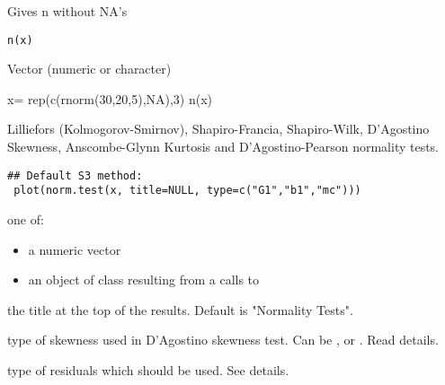 \documentclass[a4paper]{book}
\begin{document}
\newpage
{}
%
\begin{Description}\relax
Gives n without NA's
\end{Description}
%
\begin{Usage}
\begin{verbatim}
n(x)
\end{verbatim}
\end{Usage}
%
\begin{Arguments}
\begin{ldescription}
\item[\code{x}] 
Vector (numeric or character)

\end{ldescription}
\end{Arguments}
%
\begin{Examples}
\begin{ExampleCode}
x= rep(c(rnorm(30,20,5),NA),3)
n(x)
\end{ExampleCode}
\end{Examples}
\newpage
{}
%
\begin{Description}\relax
Lilliefors (Kolmogorov-Smirnov), Shapiro-Francia, Shapiro-Wilk, 
D'Agostino Skewness, Anscombe-Glynn Kurtosis and D'Agostino-Pearson normality tests.
\end{Description}
%
\begin{Usage}
\begin{verbatim}
## Default S3 method:
 plot(norm.test(x, title=NULL, type=c("G1","b1","mc")))
\end{verbatim}
\end{Usage}
%
\begin{Arguments}
\begin{ldescription}
\item[\code{x}] one of:
\begin{itemize}

\item a numeric vector
\item an object of class  resulting from a
calls to 

\end{itemize}


\item[\code{title }] the title at the top of the results. Default is "Normality Tests".
\item[\code{sk }] type of skewness used in D'Agostino skewness test. Can be , or . Read details.
\item[\code{type }] type of residuals which should be used. See details.
\end{ldescription}
\end{Arguments}
\end{document}
